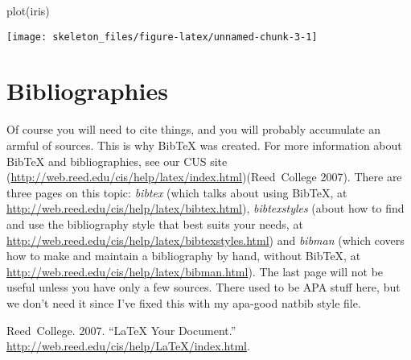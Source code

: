 \documentclass[12pt,twoside]{reedthesis}
\begin{document}
\begin{CodeChunk}
\begin{CodeInput}
plot(iris)
\end{CodeInput}


\begin{center}\texttt{[image: skeleton\_files/figure-latex/unnamed-chunk-3-1]} \end{center}

\end{CodeChunk}

\section{Bibliographies}

Of course you will need to cite things, and you will probably accumulate
an armful of sources. This is why BibTeX was created. For more
information about BibTeX and bibliographies, see our CUS site
(\url{http://web.reed.edu/cis/help/latex/index.html})(Reed{~}College
2007). There are three pages on this topic: \emph{bibtex} (which talks
about using BibTeX, at
\url{http://web.reed.edu/cis/help/latex/bibtex.html}),
\emph{bibtexstyles} (about how to find and use the bibliography style
that best suits your needs, at
\url{http://web.reed.edu/cis/help/latex/bibtexstyles.html}) and
\emph{bibman} (which covers how to make and maintain a bibliography by
hand, without BibTeX, at
\url{http://web.reed.edu/cis/help/latex/bibman.html}). The last page
will not be useful unless you have only a few sources. There used to be
APA stuff here, but we don't need it since I've fixed this with my
apa-good natbib style file.

\clearpage

Reed{~}College. 2007. ``LaTeX Your Document.''
\url{http://web.reed.edu/cis/help/LaTeX/index.html}.

\backmatter



\end{document}
